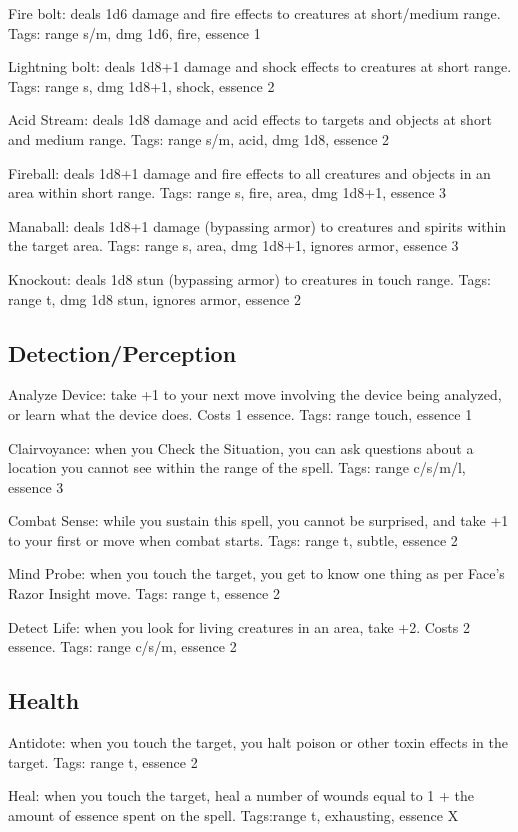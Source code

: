 Fire bolt: deals 1d6 damage and fire effects to creatures at short/medium range. Tags: range s/m, dmg 1d6, fire, essence 1

Lightning bolt: deals 1d8+1 damage and shock effects to creatures at short range. Tags: range s, dmg 1d8+1, shock, essence 2

Acid Stream: deals 1d8 damage and acid effects to targets and objects at short and medium range. Tags: range s/m, acid, dmg 1d8, essence 2

Fireball: deals 1d8+1 damage and fire effects to all creatures and objects in an area within short range. Tags: range s, fire, area, dmg 1d8+1, essence 3

Manaball: deals 1d8+1 damage (bypassing armor) to creatures and spirits within the target area. Tags: range s, area, dmg 1d8+1, ignores armor, essence 3

Knockout: deals 1d8 stun (bypassing armor) to creatures in touch range. Tags: range t, dmg 1d8 stun, ignores armor, essence 2


\subsection{Detection/Perception}
Analyze Device: take +1 to your next move involving the device being analyzed, or learn what the device does. Costs 1 essence. Tags: range touch, essence 1

Clairvoyance: when you Check the Situation, you can ask questions about a location you cannot see within the range of the spell. Tags: range c/s/m/l, essence 3

Combat Sense: while you sustain this spell, you cannot be surprised, and take +1 to your first  or  move when combat starts. Tags: range t, subtle, essence 2

Mind Probe: when you touch the target, you get to know one thing as per Face’s Razor Insight move. Tags: range t, essence 2

Detect Life: when you look for living creatures in an area, take +2. Costs 2 essence. Tags: range c/s/m, essence 2


\subsection{Health}
Antidote: when you touch the target, you halt poison or other toxin effects in the target. Tags: range t, essence 2

Heal: when you touch the target, heal a number of wounds equal to 1 + the amount of essence spent on the spell. Tags:range t, exhausting, essence X

